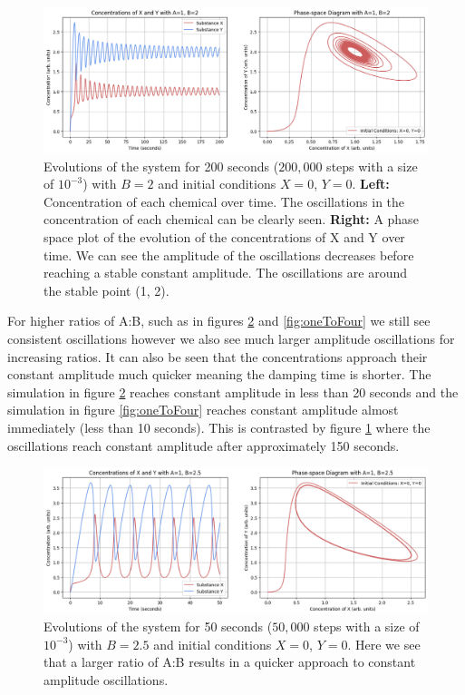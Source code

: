 \documentclass[reprint, amsmath, amssymb, aps]{revtex4-2}
\begin{document}
\begin{figure}
\includegraphics[width=1.65\columnwidth]{combinedPlot.png}
\caption{\label{fig:oneToTwo}Evolutions of the system for 200 seconds ($200,000$ steps with a size of $10^{-3}$) with $B=2$ and initial conditions $X=0$, $Y=0$. \textbf{Left:} Concentration of each chemical over time. The oscillations in the concentration of each chemical can be clearly seen. \textbf{Right:} A phase space plot of the evolution of the concentrations of X and Y over time. We can see the amplitude of the oscillations decreases before reaching a stable constant amplitude. The oscillations are around the stable point (1, 2).}
\end{figure}

For higher ratios of A:B, such as in figures \ref{fig:oneToTwo-Five} and \ref{fig:oneToFour} we still see consistent oscillations however we also see much larger amplitude oscillations for increasing ratios. It can also be seen that the concentrations approach their constant amplitude much quicker meaning the damping time is shorter. The simulation in figure \ref{fig:oneToTwo-Five} reaches constant amplitude in less than 20 seconds and the simulation in figure \ref{fig:oneToFour} reaches constant amplitude almost immediately (less than 10 seconds). This is contrasted by figure \ref{fig:oneToTwo} where the oscillations reach constant amplitude after approximately 150 seconds. \\

\begin{figure}
\includegraphics[width=1.65\columnwidth]{oneToTwo-Five.png}
\caption{\label{fig:oneToTwo-Five}Evolutions of the system for 50 seconds ($50,000$ steps with a size of $10^{-3}$) with $B=2.5$ and initial conditions $X=0$, $Y=0$. Here we see that a larger ratio of A:B results in a quicker approach to constant amplitude oscillations.}
\end{figure}
\end{document}
